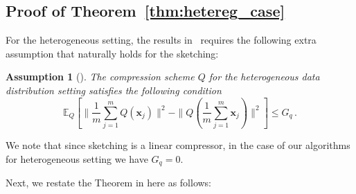 \documentclass{article}
\newtheorem{assumption}{Assumption}
\begin{document}
\subsection{Proof of Theorem~\ref{thm:hetereg_case}}
For the heterogeneous setting, the results in~\cite{haddadpour2020federated} requires the following extra assumption that naturally holds for the sketching: 

\begin{assumption}[\cite{haddadpour2020federated}]\label{assum:009}
The compression scheme $Q$ for the heterogeneous data distribution setting satisfies the following condition 
$$\mathbb{E}_Q[\|\frac{1}{m}\sum_{j=1}^m Q(\boldsymbol{x}_j)\|^2-\|Q(\frac{1}{m}\sum_{j=1}^m \boldsymbol{x}_j)\|^2]\leq G_q \, .$$
\end{assumption}
We note that since sketching is a linear compressor, in the case of our algorithms for heterogeneous setting we have $G_q=0$. 

Next, we restate the Theorem in \cite{haddadpour2020federated} here as follows:
\end{document}
